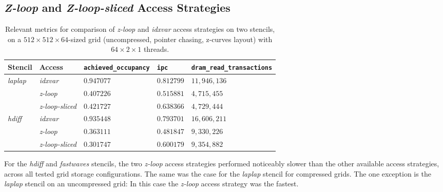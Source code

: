 



\subsection{\emph{Z-loop} and \emph{Z-loop-sliced} Access Strategies}

\begin{table}
	\begin{tabular}{l l p{2.5cm} p{2.5cm} p{2.5cm}}
		\hline
		\textbf{Stencil} & \textbf{Access} & \textbf{\texttt{achieved\_\allowbreak occupancy}} & \textbf{\texttt{ipc}} & \textbf{\texttt{dram\_\allowbreak read\_\allowbreak transactions}} \\
		\hline
		\hline
		\emph{laplap} & \emph{idxvar} & $0.947077$ & $0.812799$ & $11,946,136$ \\
		& \emph{z-loop} & $0.407226$ & $0.515881$ & $4,715,455$ \\
		& \emph{z-loop-sliced} & $0.421727$ & $0.638366$ & $4,729,444$ \\
		\hline
		\emph{hdiff} & \emph{idxvar} & $0.935448$ & $0.793701$ & $16,606,211$ \\
		& \emph{z-loop} & $0.363111$ & $0.481847$ & $9,330,226$ \\
		& \emph{z-loop-sliced} & $0.301747$ & $0.600179$ & $9,354,882$ \\
		\hline
	\end{tabular}
	\caption{\label{tab:access-z-loop} Relevant metrics for comparison of \emph{z-loop} and \emph{idxvar} access strategies on two stencils, on a $512\times 512\times 64$-sized grid (uncompressed, pointer chasing, z-curves layout) with $64\times 2\times 1$ threads.}
\end{table}

For the \emph{hdiff} and \emph{fastwaves} stencils, the two \emph{z-loop} access strategies performed noticeably slower than the other available access strategies, across all tested grid storage configurations. The same was the case for the \emph{laplap} stencil for compressed grids. The one exception is the \emph{laplap} stencil on an uncompressed grid: In this case the \emph{z-loop} access strategy was the fastest.

